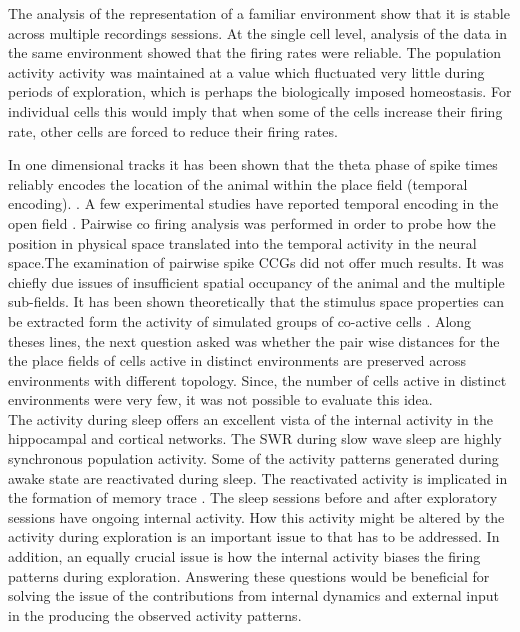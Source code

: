 The analysis of the representation of a familiar environment show that it is stable across multiple recordings sessions. At the single cell level, analysis of the data in the same environment showed that the firing rates were reliable. The population activity activity was maintained at a value which fluctuated very little during periods of exploration, which is perhaps the biologically imposed homeostasis. For individual cells this would imply that when some of the cells increase their firing rate, other cells are forced to reduce their firing rates. 

In one dimensional tracks it has been shown that the theta phase of spike times reliably encodes the location of the animal within the place field (temporal encoding). \cite{O'Keefe1993, Skaggs1996c, Huxter2003}. A few experimental studies have reported temporal encoding in the open field \cite{Huxter2008a}. Pairwise co firing analysis was performed in order to probe how the position in physical space translated into the temporal activity in the neural space.The examination of pairwise spike CCGs did not offer much results. It was chiefly due issues of insufficient spatial occupancy of the animal and the multiple sub-fields. It has been shown theoretically that the stimulus space properties can be extracted form the activity of simulated groups of co-active cells \cite{Curto2008}. Along theses lines, the next question asked was whether the pair wise distances for the the place fields of cells active in distinct environments are preserved across environments with different topology. Since, the number of cells active in distinct environments were very few, it was not possible to evaluate this idea. \\

The activity during sleep offers an excellent vista of the internal activity in the hippocampal and cortical networks. The SWR during slow wave sleep are highly synchronous population activity. Some of the activity patterns generated during awake state are reactivated during sleep. The reactivated activity is implicated in the formation of memory trace \cite{Buzsaki1989}. The sleep sessions before and after exploratory sessions have ongoing internal activity. How this activity might be altered by the activity during exploration is an important issue to that has to be addressed. In addition, an equally crucial issue is how the internal activity biases the firing patterns during exploration. Answering these questions would be beneficial for solving the issue of the contributions from internal dynamics and external input in the producing the observed activity patterns.  \\

